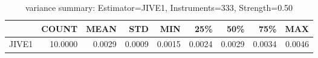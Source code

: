 \begin{table}[ht]
\centering
\caption{variance summary: Estimator=JIVE1, Instruments=333, Strength=0.50}
\begin{tabular}{lrrrrrrrr}
\toprule
 & COUNT & MEAN & STD & MIN & 25\% & 50\% & 75\% & MAX \\
\midrule
JIVE1 & 10.0000 & 0.0029 & 0.0009 & 0.0015 & 0.0024 & 0.0029 & 0.0034 & 0.0046 \\
\bottomrule
\end{tabular}
\end{table}
